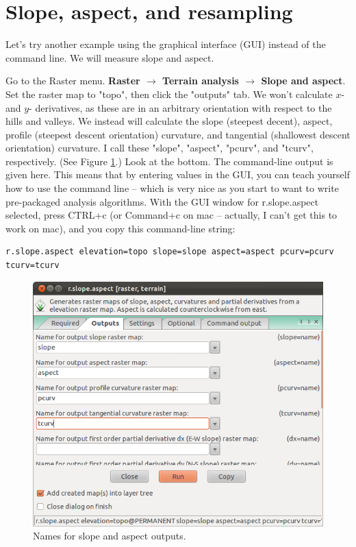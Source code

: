 \documentclass{book}
\begin{document}
\section{Slope, aspect, and resampling \label{s:slope.aspect.resample}}

Let's try another example using the graphical interface (GUI) instead of the command line. We will measure slope and aspect.

Go to the Raster menu. {\bf Raster $\rightarrow$ Terrain analysis $\rightarrow$ Slope and aspect}. Set the raster map to "topo", then click the "outputs" tab. We won't calculate $x$- and $y$- derivatives, as these are in an arbitrary orientation with respect to the hills and valleys. We instead will calculate the slope (steepest decent), aspect, profile (steepest descent orientation) curvature, and tangential (shallowest descent orientation) curvature. I call these "slope", "aspect", "pcurv", and "tcurv", respectively. (See Figure \ref{fig:slope_aspect}.) Look at the bottom. The command-line output is given here. This means that by entering values in the GUI, you can teach yourself how to use the command line -- which is very nice as you start to want to write pre-packaged analysis algorithms. With the GUI window for r.slope.aspect selected, press CTRL+c (or Command+c on mac -- actually, I can't get this to work on mac), and you copy this command-line string:

\begin{lstlisting}
r.slope.aspect elevation=topo slope=slope aspect=aspect pcurv=pcurv tcurv=tcurv
\end{lstlisting}

\begin{figure}[h]
 \begin{center}
 \includegraphics[width=.9\linewidth]{figures/ubuntu/slope_aspect.png}
 \caption{Names for slope and aspect outputs.}
 \label{fig:slope_aspect}
 \end{center}
\end{figure}
\end{document}

